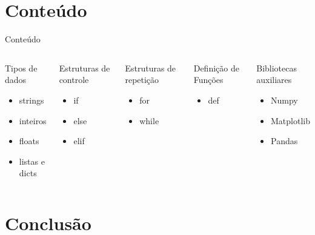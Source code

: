 \section{Conteúdo}
\begin{frame}{Conteúdo}

	\begin{columns}
			
			\begin{block}{Tipos de dados}
				
				\begin{itemize}
					\item strings 
					\item inteiros
					\item floats
					\item listas e dicts
				\end{itemize}
			\end{block}
			
			\begin{block}{Estruturas de controle}
				\begin{itemize}
					\item if 
					\item else
					\item elif
				\end{itemize}
			\end{block}
			
				
			
			
			\begin{block}{Estruturas de repetição}
				\begin{itemize}
					\item for
					\item while
				\end{itemize}
			\end{block}
		
			\begin{block}{Definição de Funções}
				\begin{itemize}
					\item def
				\end{itemize}
			\end{block}
		
			\begin{block}{Bibliotecas auxiliares}
				\begin{itemize}
					\item Numpy
					\item Matplotlib
					\item Pandas
				\end{itemize}
			\end{block}

	\end{columns}
	

\end{frame}



\section{Conclusão}
